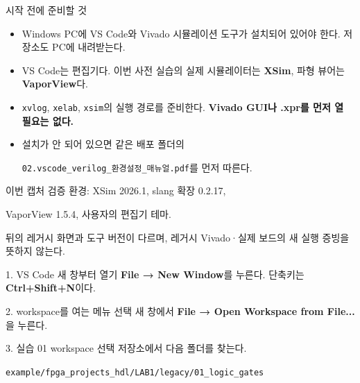 \begin{frame}[label=vsc01-prepare]{시작 전에 준비할 것}
\small
\begin{itemize}
\setlength{\itemsep}{0.20cm}
\item Windows PC에 VS Code와 Vivado 시뮬레이션 도구가 설치되어 있어야 한다. 저장소도 PC에 내려받는다.
\item VS Code는 편집기다. 이번 사전 실습의 실제 시뮬레이터는 \textbf{XSim}, 파형 뷰어는 \textbf{VaporView}다.
\item \texttt{xvlog}, \texttt{xelab}, \texttt{xsim}의 실행 경로를 준비한다. \textbf{Vivado GUI나 .xpr를 먼저 열 필요는 없다.}
\item 설치가 안 되어 있으면 같은 배포 폴더의\par
\texttt{02.vscode\_verilog\_환경설정\_매뉴얼.pdf}를 먼저 따른다.
\end{itemize}
\vspace{0.35cm}
이번 캡처 검증 환경: XSim 2026.1, slang 확장 0.2.17,\par
VaporView 1.5.4, 사용자의 편집기 테마.\par\vspace{0.2cm}
뒤의 레거시 화면과 도구 버전이 다르며, 레거시 Vivado·실제 보드의 새 실행 증빙을 뜻하지 않는다.
\end{frame}

\begin{frame}{1. VS Code 새 창부터 열기}
\small \textbf{File → New Window}를 누른다. 단축키는 \textbf{Ctrl+Shift+N}이다.
\end{frame}

\begin{frame}{2. workspace를 여는 메뉴 선택}
\small 새 창에서 \textbf{File → Open Workspace from File...}을 누른다.
\end{frame}

\begin{frame}{3. 실습 01 workspace 선택}
\small 저장소에서 다음 폴더를 찾는다.\par
{\scriptsize\texttt{example/fpga\_projects\_hdl/LAB1/legacy/01\_logic\_gates}}
\end{frame}

